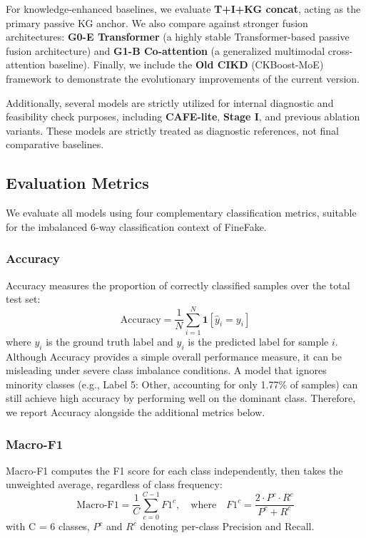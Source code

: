 For knowledge-enhanced baselines, we evaluate \textbf{T+I+KG concat}, acting as the primary passive KG anchor. We also compare against stronger fusion architectures: \textbf{G0-E Transformer} (a highly stable Transformer-based passive fusion architecture) and \textbf{G1-B Co-attention} (a generalized multimodal cross-attention baseline). Finally, we include the \textbf{Old CIKD} (CKBoost-MoE) framework to demonstrate the evolutionary improvements of the current version.

Additionally, several models are strictly utilized for internal diagnostic and feasibility check purposes, including \textbf{CAFE-lite}, \textbf{Stage I}, and previous ablation variants. These models are strictly treated as diagnostic references, not final comparative baselines.

\subsection{Evaluation Metrics}
We evaluate all models using four complementary classification metrics, suitable for the imbalanced 6-way classification context of FineFake.

\subsubsection{Accuracy}
Accuracy measures the proportion of correctly classified samples over the total test set:
\begin{equation}
\text{Accuracy} = \frac{1}{N} \sum_{i=1}^N \mathbf{1}[\hat{y}_i = y_i]
\end{equation}
where $y_i$ is the ground truth label and $\hat{y}_i$ is the predicted label for sample $i$. Although Accuracy provides a simple overall performance measure, it can be misleading under severe class imbalance conditions. A model that ignores minority classes (e.g., Label 5: Other, accounting for only 1.77\% of samples) can still achieve high accuracy by performing well on the dominant class. Therefore, we report Accuracy alongside the additional metrics below.

\subsubsection{Macro-F1}
Macro-F1 computes the F1 score for each class independently, then takes the unweighted average, regardless of class frequency:
\begin{equation}
\text{Macro-F1} = \frac{1}{C} \sum_{c=0}^{C-1} F1^c, \quad \text{where} \quad F1^c = \frac{2 \cdot P^c \cdot R^c}{P^c + R^c}
\end{equation}
with C = 6 classes, $P^c$ and $R^c$ denoting per-class Precision and Recall.

